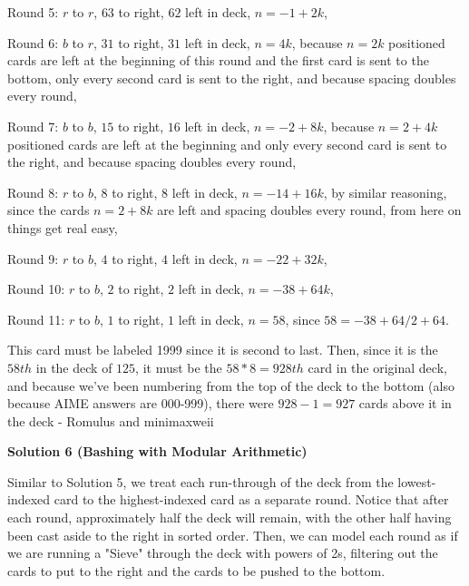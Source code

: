 \begin{enumerate}
 Round 5: $r$ to $r$, $63$ to right, $62$ left in deck, $n = -1 + 2k$,

 Round 6: $b$ to $r$, $31$ to right, $31$ left in deck, $n = 4k$, because $n = 2k$ positioned cards are left at the beginning of this round and the first card is sent to the bottom, only every second card is sent to the right, and because spacing doubles every round,

 Round 7: $b$ to $b$, $15$ to right, $16$ left in deck, $n = -2 + 8k$, because $n = 2 + 4k$ positioned cards are left at the beginning and only every second card is sent to the right, and because spacing doubles every round,

 Round 8: $r$ to $b$, $8$ to right, $8$ left in deck, $n = -14 + 16k$, by similar reasoning, since the cards $n = 2 + 8k$ are left and spacing doubles every round, from here on things get real easy,

 Round 9: $r$ to $b$, $4$ to right, $4$ left in deck, $n = -22 + 32k$,

 Round 10: $r$ to $b$, $2$ to right, $2$ left in deck, $n = -38 + 64k$,

 Round 11: $r$ to $b$, $1$ to right, $1$ left in deck, $n = 58$, since $58 = -38 + 64/2 + 64$.

 This card must be labeled 1999 since it is second to last. Then, since it is the $58th$ in the deck of $125$, it must be the $58 * 8 = 928th$ card in the original deck, and because we've been numbering from the top of the deck to the bottom (also because AIME answers are 000-999), there were $928 - 1 = \boxed{927}$ cards above it in the deck - Romulus and minimaxweii

 



\textbf{Solution 6 (Bashing with Modular Arithmetic)}

Similar to Solution 5, we treat each run-through of the deck from the lowest-indexed card to the highest-indexed card as a separate round. Notice that after each round, approximately half the deck will remain, with the other half having been cast aside to the right in sorted order. Then, we can model each round as if we are running a "Sieve" through the deck with powers of 2s, filtering out the cards to put to the right and the cards to be pushed to the bottom.


\end{enumerate}
